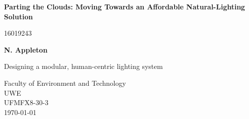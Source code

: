 \documentclass[twoside,twocolumn]{report}
\begin{document}
\begin{titlepage}

    \begin{center}
        \vspace*{1cm}
            
        \Huge
        \textbf{Parting the Clouds: Moving Towards an Affordable Natural-Lighting Solution}
            
        \vspace{0.5cm}
        \LARGE
        16019243
            
        \vspace{1.5cm}
            
        \textbf{N. Appleton}
            
        \vfill
            
        Designing a modular, human-centric lighting system            
            
        \vspace{0.8cm}
            
        \Large
        Faculty of Environment and Technology\\
        UWE\\
        UFMFX8-30-3 \\
        \today
            
    \end{center}
\end{titlepage}

\tableofcontents \clearpage \newpage






\clearpage
\newpage


\end{document}
